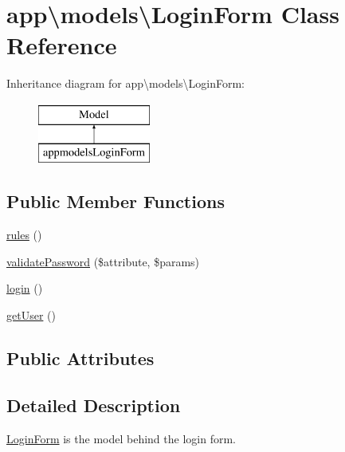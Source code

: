 \hypertarget{classapp_1_1models_1_1LoginForm}{}\section{app\textbackslash{}models\textbackslash{}Login\+Form Class Reference}
\label{classapp_1_1models_1_1LoginForm}
Inheritance diagram for app\textbackslash{}models\textbackslash{}Login\+Form\+:\begin{figure}[H]
\begin{center}
\leavevmode
\includegraphics[height=2.000000cm]{classapp_1_1models_1_1LoginForm}
\end{center}
\end{figure}
\subsection*{Public Member Functions}
\begin{DoxyCompactItemize}
\item 
\hyperlink{classapp_1_1models_1_1LoginForm_ae8fce695061e13aea1f01114a49f2ab5}{rules} ()
\item 
\hyperlink{classapp_1_1models_1_1LoginForm_ab18ca60438364b0e4781e0d54855c641}{validate\+Password} (\$attribute, \$params)
\item 
\hyperlink{classapp_1_1models_1_1LoginForm_a934b2fb03be75b656cc23fd59f6619f4}{login} ()
\item 
\hyperlink{classapp_1_1models_1_1LoginForm_aff4dcbbf9b5a3e1f433cb4f88343d54a}{get\+User} ()
\end{DoxyCompactItemize}
\subsection*{Public Attributes}
\begin{DoxyCompactItemize}
\end{DoxyCompactItemize}


\subsection{Detailed Description}
\hyperlink{classapp_1_1models_1_1LoginForm}{Login\+Form} is the model behind the login form. 

